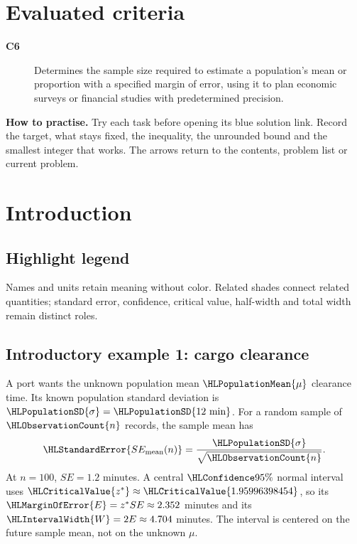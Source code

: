 \maketitle
\setcounter{tocdepth}{1}
\setcounter{secnumdepth}{2}
\label{toc}
\tableofcontents
\section*{Evaluated criteria}
\begin{description}
\item[\textbf{C6}] Determines the sample size required to estimate a population's mean or proportion with a specified margin of error, using it to plan economic surveys or financial studies with predetermined precision.
\end{description}
\textbf{How to practise.} Try each task before opening its blue solution link. Record the target, what stays fixed, the inequality, the unrounded bound and the smallest integer that works. The arrows return to the contents, problem list or current problem.
\clearpage
\section{Introduction}\label{sec:introduction}
\subsection*{Highlight legend}\label{tab:highlight-legend}
Names and units retain meaning without color. Related shades connect related quantities; standard error, confidence, critical value, half-width and total width remain distinct roles.
\subsection{Introductory example 1: cargo clearance}\label{ex:intro-one}
A port wants the unknown population mean $\HLPopulationMean{\mu}$ clearance time. Its known population standard deviation is $\HLPopulationSD{\sigma}=\HLPopulationSD{12\text{ min}}$. For a random sample of $\HLObservationCount{n}$ records, the sample mean has
\[
\HLStandardError{SE_{\rm mean}(n)}=\frac{\HLPopulationSD{\sigma}}{\sqrt{\HLObservationCount{n}}}.
\]
At $n=100$, $SE=1.2$ minutes. A central $\HLConfidence{95\%}$ normal interval uses $\HLCriticalValue{z^*}\approx\HLCriticalValue{1.95996398454}$, so its $\HLMarginOfError{E}=z^*SE\approx2.352$ minutes and its $\HLIntervalWidth{W}=2E\approx4.704$ minutes. The interval is centered on the future sample mean, not on the unknown $\mu$.
